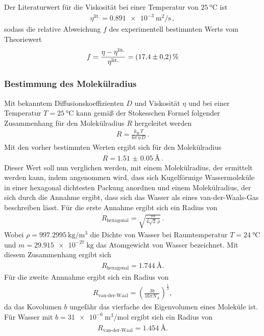 Der Literaturwert\cite{litvisk} für die Viskosität bei einer Temperatur von $\SI{25}{\celsius}$ ist
\begin{align*}
  \eta^\text{lit.} = \SI{0.891e-3}{\meter\squared\per\second} \, ,
\end{align*}
sodass die relative Abweichung $f$ des experimentell bestimmten Werts
vom Theoriewert
\begin{align*}
  f = \frac{\eta - \eta^\text{lit.}}{\eta^\text{lit.}} = \SI{17.4+-0.2}{\percent}
\end{align*}


\FloatBarrier
\subsubsection{Bestimmung des Molekülradius}
\label{subsubsec:molekuelradius}
Mit bekanntem Diffusionskoeffizienten $D$ und Viskosität $\eta$
und bei einer Temperatur $T=\SI{25}{\celsius}$
kann gemäß
der Stokesschen Formel folgender Zusammenhang für den Molekülradius $R$ hergeleitet werden
\begin{align}
  \label{eqn:stokes}
  R = \frac{k_\text{B} \, T}{6 \pi \, \eta \, D} \, .
\end{align}
Mit den vorher bestimmten Werten ergibt sich für den Molekülradius
\begin{align*}
  R = \SI{1.51(5)}{\angstrom} \, .
\end{align*}
Dieser Wert soll nun verglichen werden, mit einem Molekülradius, der ermittelt werden kann,
indem angenommen wird, dass sich
Kugelförmige Wassermoleküle in einer hexagonal dichtesten Packung anordnen
und einem Molekülradius, der sich durch die Annahme ergibt, dass sich das Wasser als eines van-der-Waals-Gas
beschreiben lässt.
Für die erste Annahme ergibt sich ein Radius von
\begin{align*}
  R_{\text{hexagonal}} = \sqrt{\frac{m}{4\sqrt{2} \, \rho}} \, .
\end{align*}
Wobei $\rho=\SI{997.2995}{\kilo\gram\per\meter\tothe{3}}$  \cite{litdicht} die Dichte von Wasser bei Raumtemperatur $T=\SI{24}{\celsius}$
und $m=\SI{29.915e-27}{\kilo\gram}$ \cite{litatomgewicht} das Atomgewicht von Wasser bezeichnet.
Mit diesem Zusammenhang ergibt sich
\begin{align*}
  R_{\text{hexagonal}} = \SI{1.744}{\angstrom}.
\end{align*}
Für die zweite Annnahme ergibt sich ein Radius von
\begin{align}
R_{\text{van-der-Waal}}= \left(\frac{3b}{16\pi N_A}\right)^{\frac{1}{3}},
\end{align}
da das Kovolumen $b$ ungefähr das
vierfache des Eigenvolumen eines Moleküle ist.
Für Wasser mit $b=\SI{31e-6}{\meter\tothe{3}\per\mol}$ \cite{litwaal} ergibt sich ein Radius von
\begin{align}
R_{\text{van-der-Waal}}= \SI{1.454}{\angstrom}.
\end{align}

